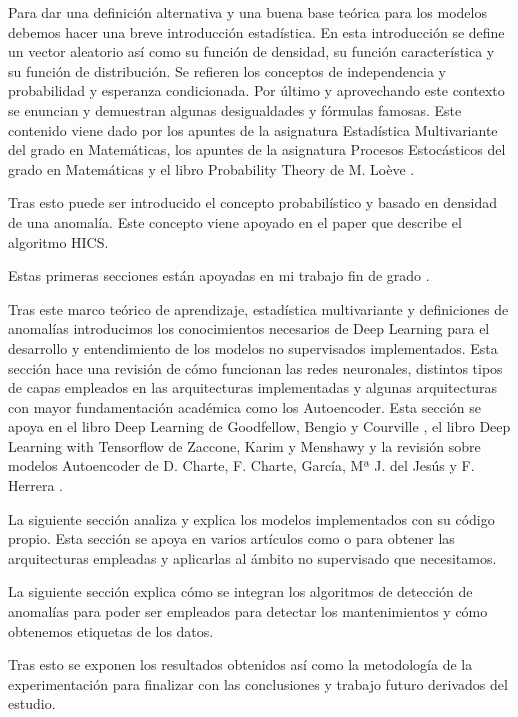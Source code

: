 Para dar una definición alternativa y una buena base teórica para los modelos debemos hacer una breve introducción estadística. En esta introducción se define un vector aleatorio así como su función de densidad, su función característica y su función de distribución. Se refieren los conceptos de independencia y probabilidad y esperanza condicionada. Por último y aprovechando este contexto se enuncian y demuestran algunas desigualdades y fórmulas famosas. Este contenido viene dado por los apuntes de la asignatura Estadística Multivariante del grado en Matemáticas, los apuntes de la asignatura Procesos Estocásticos del grado en Matemáticas y el libro Probability Theory de M. Loève \cite{m_loeve_probability_1977}.

Tras esto puede ser introducido el concepto probabilístico y basado en densidad de una anomalía. Este concepto viene apoyado en el paper \cite{fabian_keller_hics_2012} que describe el algoritmo HICS.

Estas primeras secciones están apoyadas en mi trabajo fin de grado \cite{aguilera_martos_deteccion_2019}.

Tras este marco teórico de aprendizaje, estadística multivariante y definiciones de anomalías introducimos los conocimientos necesarios de Deep Learning para el desarrollo y entendimiento de los modelos no supervisados implementados. Esta sección hace una revisión de cómo funcionan las redes neuronales, distintos tipos de capas empleados en las arquitecturas implementadas y algunas arquitecturas con mayor fundamentación académica como los Autoencoder. Esta sección se apoya en el libro Deep Learning de Goodfellow, Bengio y Courville \cite{goodfellow_deep_2016}, el libro Deep Learning with Tensorflow de Zaccone, Karim y Menshawy \cite{giancarlo_deep_2017} y la revisión sobre modelos Autoencoder de D. Charte, F. Charte, García, Mª J. del Jesús y F. Herrera \cite{david_practical_2018}.

La siguiente sección analiza y explica los modelos implementados con su código propio. Esta sección se apoya en varios artículos como \cite{lih_oh_automated_2018} o \cite{david_practical_2018} para obtener las arquitecturas empleadas y aplicarlas al ámbito no supervisado que necesitamos.

La siguiente sección explica cómo se integran los algoritmos de detección de anomalías para poder ser empleados para detectar los mantenimientos y cómo obtenemos etiquetas de los datos.

Tras esto se exponen los resultados obtenidos así como la metodología de la experimentación para finalizar con las conclusiones y trabajo futuro derivados del estudio.

